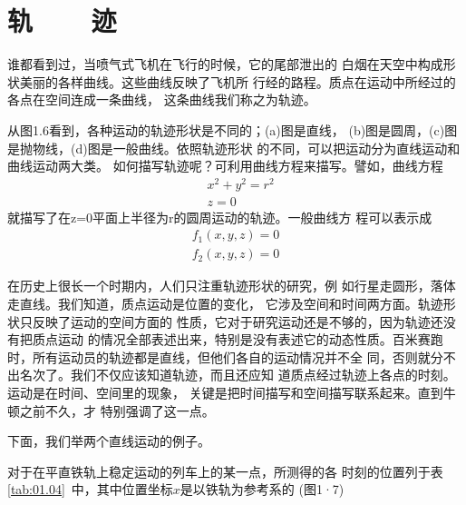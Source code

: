 \section[轨迹]{轨~~~~迹}\label{sec:01.05}

谁都看到过，当喷气式飞机在飞行的时候，它的尾部泄出的
白烟在天空中构成形状美丽的各样曲线。这些曲线反映了飞机所
行经的路程。质点在运动中所经过的各点在空间连成一条曲线，
这条曲线我们称之为轨迹。

从图1.6看到，各种运动的轨迹形状是不同的；(a)图是直线，
(b)图是圆周，(c)图是抛物线，(d)图是一般曲线。依照轨迹形状
的不同，可以把运动分为直线运动和曲线运动两大类。
如何描写轨迹呢？可利用曲线方程来描写。譬如，曲线方程
\begin{align*}
     & x^2+y^2=r^2 \\
     & z=0
\end{align*}
就描写了在z=0平面上半径为r的圆周运动的轨迹。一般曲线方
程可以表示成
\begin{align*}
    f_1(x,y,z)=0 \\
    f_2(x,y,z)=0
\end{align*}

在历史上很长一个时期内，人们只注重轨迹形状的研究，例
如行星走圆形，落体走直线。我们知道，质点运动是位置的变化，
它涉及空间和时间两方面。轨迹形状只反映了运动的空间方面的
性质，它对于研究运动还是不够的，因为轨迹还没有把质点运动
的情况全部表述出来，特别是没有表述它的动态性质。百米赛跑
时，所有运动员的轨迹都是直线，但他们各自的运动情况并不全
同，否则就分不出名次了。我们不仅应该知道轨迹，而且还应知
道质点经过轨迹上各点的时刻。运动是在时间、空间里的现象，
关键是把时间描写和空间描写联系起来。直到牛顿之前不久，才
特别强调了这一点。

下面，我们举两个直线运动的例子。

对于在平直铁轨上稳定运动的列车上的某一点，所测得的各
时刻的位置列于表\ref{tab:01.04}~中，其中位置坐标$x$是以铁轨为参考系的
(图1·7)
\begin{table}[!h]
    \vspace{-0.5em}
    \caption{}
    \label{tab:01.04}
    \centering
    \vspace{-1.2em}
\end{table}

